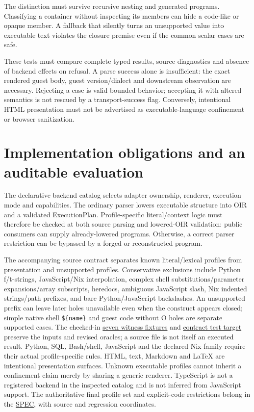 \documentclass[11pt]{article}
\begin{document}
The distinction must survive recursive nesting and generated programs. Classifying a container without inspecting its members can hide a code-like or opaque member. A fallback that silently turns an unsupported value into executable text violates the closure premise even if the common scalar cases are safe.

These tests must compare complete typed results, source diagnostics and absence of backend effects on refusal. A parse success alone is insufficient: the exact rendered guest body, guest version/dialect and downstream observation are necessary. Rejecting a case is valid bounded behavior; accepting it with altered semantics is not rescued by a transport-success flag. Conversely, intentional HTML presentation must not be advertised as executable-language confinement or browser sanitization.

\clearpage

\section{Implementation obligations and an auditable evaluation}

The declarative backend catalog selects adapter ownership, renderer, execution mode and capabilities. The ordinary parser lowers executable structure into OIR and a validated ExecutionPlan. Profile-specific literal/context logic must therefore be checked at both source parsing and lowered-OIR validation: public consumers can supply already-lowered programs. Otherwise, a correct parser restriction can be bypassed by a forged or reconstructed program.

The accompanying source contract separates known literal/lexical profiles from presentation and unsupported profiles. Conservative exclusions include Python f/t-strings, JavaScript/Nix interpolation, complex shell substitutions/parameter expansions/array subscripts, heredocs, ambiguous JavaScript slash, Nix indented strings/path prefixes, and bare Python/JavaScript backslashes. An unsupported prefix can leave later holes unavailable even when the construct appears closed; simple native shell \texttt{\$\{name\}} and guest code without O holes are separate supported cases. The checked-in \href{../../tests/fixtures/foreign-splice-witnesses.json}{seven witness fixtures} and \href{../../tests/foreign_splice_contract.rs}{contract test target} preserve the inputs and revised oracles; a source file is not itself an executed result. Python, SQL, Bash/shell, JavaScript and the declared Nix family require their actual profile-specific rules. HTML, text, Markdown and LaTeX are intentional presentation surfaces. Unknown executable profiles cannot inherit a confinement claim merely by sharing a generic renderer. TypeScript is not a registered backend in the inspected catalog and is not inferred from JavaScript support. The authoritative final profile set and explicit-code restrictions belong in the \href{../../SPEC.md}{SPEC}, with source and regression coordinates.
\end{document}
